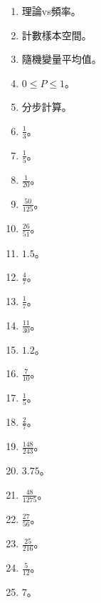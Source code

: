 \begin{enumerate}[label=\arabic*.]
    \item 理論vs頻率。
    \item 計數樣本空間。
    \item 隨機變量平均值。
    \item $0 \leq P \leq 1$。
    \item 分步計算。
    \item $\frac{1}{3}$。
    \item $\frac{1}{5}$。
    \item $\frac{1}{20}$。
    \item $\frac{50}{125}$。
    \item $\frac{26}{51}$。
    \item $1.5$。
    \item $\frac{4}{7}$。
    \item $\frac{1}{7}$。
    \item $\frac{11}{30}$。
    \item $1.2$。
    \item $\frac{7}{10}$。
    \item $\frac{1}{5}$。
    \item $\frac{2}{7}$。
    \item $\frac{148}{243}$。
    \item $3.75$。
    \item $\frac{48}{1275}$。
    \item $\frac{27}{56}$。
    \item $\frac{25}{216}$。
    \item $\frac{5}{12}$。
    \item $7$。
\end{enumerate}

